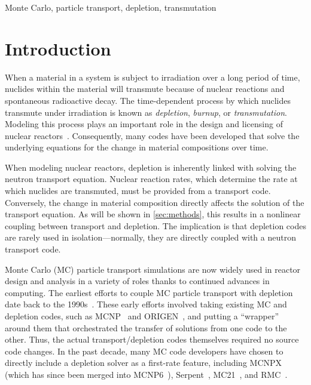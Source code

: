 \documentclass[3p,authoryear]{elsarticle}
\begin{document}
\begin{keyword}
  Monte Carlo, particle transport, depletion, transmutation
\end{keyword}

\maketitle

\section{Introduction}

When a material in a system is subject to irradiation over a long period of
time, nuclides within the material will transmute because of nuclear reactions
and spontaneous radioactive decay. The time-dependent process by which nuclides
transmute under irradiation is known as \emph{depletion}, \emph{burnup}, or
\emph{transmutation}. Modeling this process plays an important role in the
design and licensing of nuclear reactors~\citep{betzler2019ned}. Consequently,
many codes have been developed that solve the underlying equations for the
change in material compositions over time.

When modeling nuclear reactors, depletion is inherently linked with solving the
neutron transport equation. Nuclear reaction rates, which determine the rate at
which nuclides are transmuted, must be provided from a transport code.
Conversely, the change in material composition directly affects the solution of
the transport equation. As will be shown in \cref{sec:methods}, this results in
a nonlinear coupling between transport and depletion. The implication is that
depletion codes are rarely used in isolation---normally, they are directly
coupled with a neutron transport code.

Monte Carlo (MC) particle transport simulations are now widely used in reactor
design and analysis in a variety of roles thanks to continued advances in
computing. The earliest efforts to couple MC particle transport with depletion
date back to the 1990s~\citep{moore1995inel,trellue1998lanl}. These early
efforts involved taking existing MC and depletion codes, such as
MCNP~\citep{goorley2012nt} and ORIGEN~\citep{croff1983nt}, and putting a
``wrapper'' around them that orchestrated the transfer of solutions from one
code to the other. Thus, the actual transport/depletion codes themselves
required no source code changes. In the past decade, many MC code developers
have chosen to directly include a depletion solver as a first-rate feature,
including MCNPX~\citep{waters2007aip} (which has since been merged into
MCNP6~\citep{goorley2012nt}), Serpent~\citep{leppanen2015ane},
MC21~\citep{griesheimer2015ane}, and RMC~\citep{wang2015ane}.
\end{document}
